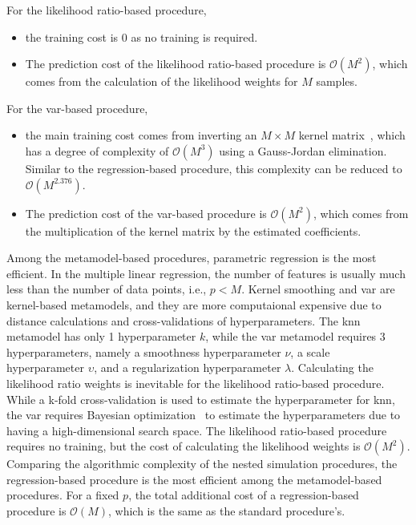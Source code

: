 For the likelihood ratio-based procedure, 
\begin{itemize}
    \item the training cost is $0$ as no training is required.
    \item The prediction cost of the likelihood ratio-based procedure is $\mathcal{O}(M^2)$, which comes from the calculation of the likelihood weights for $M$ samples.
\end{itemize}
For the \gls{var}-based procedure, 
\begin{itemize}
    \item the main training cost comes from inverting an $M \times M$ kernel matrix~\citep{scholkopf2002learning}, which has a degree of complexity of $\mathcal{O}(M^3)$ using a Gauss-Jordan elimination.
          Similar to the regression-based procedure, this complexity can be reduced to $\mathcal{O}(M^{2.376})$.
    \item The prediction cost of the \gls{var}-based procedure is $\mathcal{O}(M^2)$, which comes from the multiplication of the kernel matrix by the estimated coefficients.
\end{itemize}
Among the metamodel-based procedures, parametric regression is the most efficient.
In the multiple linear regression, the number of features is usually much less than the number of data points, i.e., $p<M$. 
Kernel smoothing and \gls{var} are kernel-based metamodels, and they are more computaional expensive due to distance calculations and cross-validations of hyperparameters. 
The \gls{knn} metamodel has only 1 hyperparameter $k$, while the \gls{var} metamodel requires 3 hyperparameters, namely a smoothness hyperparameter $\nu$, a scale hyperparameter $\upsilon$, and a regularization hyperparameter $\lambda$.
Calculating the likelihood ratio weights is inevitable for the likelihood ratio-based procedure. 
While a k-fold cross-validation is used to estimate the hyperparameter for \gls{knn}, the \gls{var} requires Bayesian optimization~\citep{shahriari2015taking} to estimate the hyperparameters due to having a high-dimensional search space.
The likelihood ratio-based procedure requires no training, but the cost of calculating the likelihood weights is $\mathcal{O}(M^2)$.
Comparing the algorithmic complexity of the nested simulation procedures, the regression-based procedure is the most efficient among the metamodel-based procedures.
For a fixed $p$, the total additional cost of a regression-based procedure is $\mathcal{O}(M)$, which is the same as the standard procedure's.

